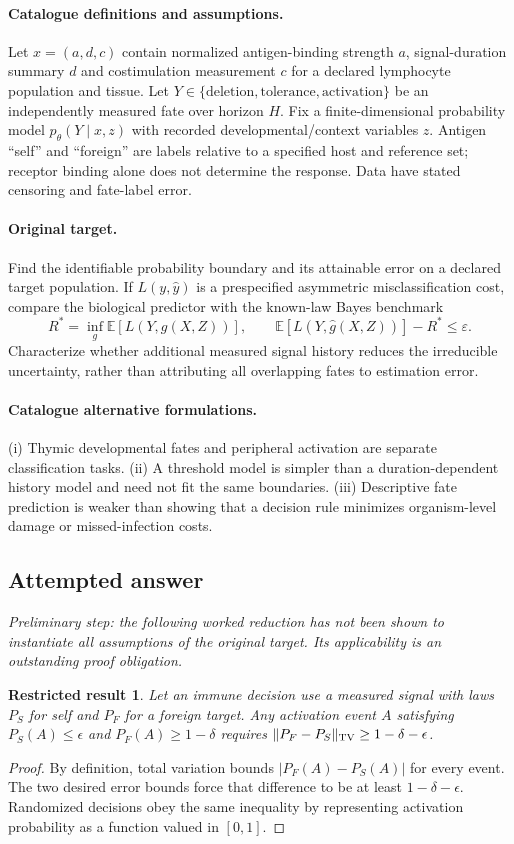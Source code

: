 \documentclass[11pt]{article}
\newcommand{\E}{\mathbb E}
\providecommand{\E}{\mathbb E}
\newtheorem{attemptresult}{Restricted result}[section]
\begin{document}
\paragraph{Catalogue definitions and assumptions.}
Let $x=(a,d,c)$ contain normalized antigen-binding strength $a$, signal-duration summary $d$ and costimulation measurement $c$ for a declared lymphocyte population and tissue. Let $Y\in\{\mathrm{deletion},\mathrm{tolerance},\mathrm{activation}\}$ be an independently measured fate over horizon $H$. Fix a finite-dimensional probability model $p_\theta(Y\mid x,z)$ with recorded developmental/context variables $z$. Antigen ``self'' and ``foreign'' are labels relative to a specified host and reference set; receptor binding alone does not determine the response. Data have stated censoring and fate-label error.
\paragraph{Original target.}
Find the identifiable probability boundary and its attainable error on a declared target population. If $L(y,\widehat y)$ is a prespecified asymmetric misclassification cost, compare the biological predictor with the known-law Bayes benchmark
    \[R^*=\inf_g\E[L(Y,g(X,Z))],\qquad
    \E[L(Y,\widehat g(X,Z))]-R^*\leq\varepsilon.\]
    Characterize whether additional measured signal history reduces the irreducible uncertainty, rather than attributing all overlapping fates to estimation error.
\paragraph{Catalogue alternative formulations.}
(i) Thymic developmental fates and peripheral activation are separate classification tasks. (ii) A threshold model is simpler than a duration-dependent history model and need not fit the same boundaries. (iii) Descriptive fate prediction is weaker than showing that a decision rule minimizes organism-level damage or missed-infection costs.
\subsection{Attempted answer}
\noindent\emph{Preliminary step: the following worked reduction has not been shown to instantiate all assumptions of the original target. Its applicability is an outstanding proof obligation.}

\begin{attemptresult}
Let an immune decision use a measured signal with laws $P_S$ for self and $P_F$ for a foreign target. Any activation event $A$ satisfying $P_S(A)\leq\epsilon$ and $P_F(A)\geq1-\delta$ requires $\|P_F-P_S\|_{\rm TV}\geq1-\delta-\epsilon$.
\end{attemptresult}
\begin{proof}
By definition, total variation bounds $|P_F(A)-P_S(A)|$ for every event. The two desired error bounds force that difference to be at least $1-\delta-\epsilon$. Randomized decisions obey the same inequality by representing activation probability as a function valued in $[0,1]$.
\end{proof}
\end{document}
